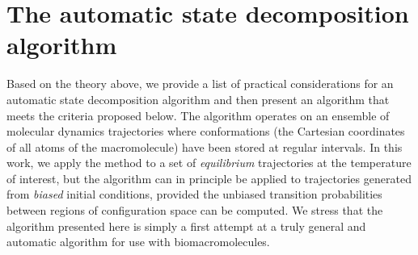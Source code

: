 
\section{The automatic state decomposition algorithm}
\label{automatic:section:methods}


Based on the theory above, we provide a list of practical considerations for an automatic state decomposition algorithm and then present an algorithm that meets the criteria proposed below.
The algorithm operates on an ensemble of molecular dynamics trajectories where conformations (the Cartesian coordinates of all atoms of the macromolecule) have been stored at regular intervals.
In this work, we apply the method to a set of \emph{equilibrium} trajectories at the temperature of interest, but the algorithm can in principle be applied to trajectories generated from \emph{biased} initial conditions, provided the unbiased transition probabilities between regions of configuration space can be computed.
We stress that the algorithm presented here is simply a first attempt at a truly general and automatic algorithm for use with biomacromolecules. 

